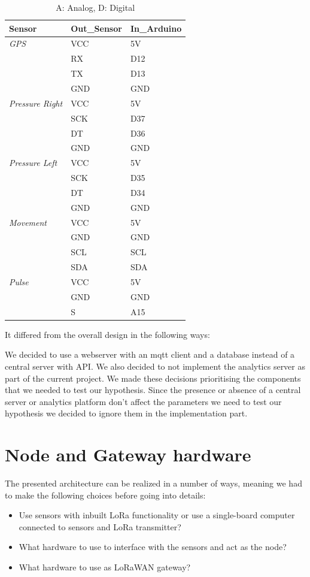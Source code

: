 \begin{table}[h]
	\begin{tabular}{l|ll}
		\textbf{Sensor} & \textbf{Out\_Sensor} & \textbf{In\_Arduino} \\\hline
		\textit{GPS} & VCC & 5V \\
		& RX & D12 \\
		& TX & D13 \\
		& GND & GND \\\hline
		\textit{Pressure Right} & VCC & 5V \\
		& SCK & D37 \\
		& DT & D36 \\
		& GND & GND \\\hline
		\textit{Pressure Left} & VCC & 5V \\
		& SCK & D35 \\
		& DT & D34 \\
		& GND & GND \\\hline
		\textit{Movement} & VCC & 5V \\
		& GND & GND \\
		& SCL & SCL \\
		& SDA & SDA \\\hline
		\textit{Pulse} & VCC & 5V \\
		& GND & GND \\
		& S & A15 
	\end{tabular}
	\caption[]{A: Analog, D: Digital}
\end{table}

It differed from the overall design in the following ways:

We decided to use a webserver with an mqtt client and a database instead of a central server with API. We also decided to not implement the analytics server as part of the current project. We made these decisions prioritising the components that we needed to test our hypothesis. Since the presence or absence of a central server or analytics platform don't affect the parameters we need to test our hypothesis we decided to ignore them in the implementation part.


\section{Node and Gateway hardware}
	The presented architecture can be realized in a number of ways, meaning we had to make the following choices before going into details:

	\begin{itemize}
		\item Use sensors with inbuilt LoRa functionality or use a single-board computer connected to sensors and LoRa transmitter?
		\item What hardware to use to interface with the sensors and act as the node?
		\item What hardware to use as LoRaWAN gateway?
	\end{itemize}


